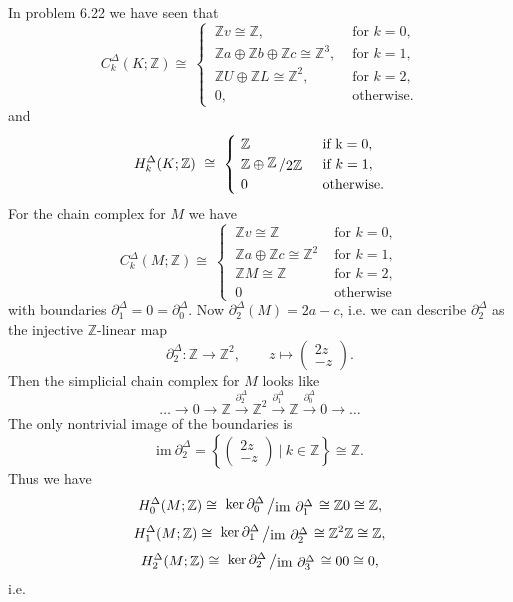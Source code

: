 \documentclass[11pt]{book}
\numberwithin{dummy}{section}
\theoremstyle{nonumberbreak}
\newenvironment{sol}[1][]{\ifthenelse{\equal{#1}{}}{\solution}{\solution[#1]}\rm}{\endsolution}
\newenvironment{prob}[1][]{\ifthenelse{\equal{#1}{}}{\problem}{\problem[#1]}\rm}{\endproblem}
\newcommand{\la}{\longrightarrow}
\newcommand{\Z}{\mathbb{Z}}
\newcommand{\slant}[2]{{\raisebox{.1em}{$#1$}\left/\raisebox{-.1em}{$#2$}\right.}}
\begin{document}
\begin{spacing}{1.4}
\begin{prob}
\begin{sol}
\begin{compactenum}
\item In problem 6.22 we have seen that
$$C_k^{\Delta}(K;\Z) \cong \ \begin{cases} \ \Z v \cong \Z, & \textrm{ for }k=0, \\ \ \Z a \oplus \Z b \oplus \Z c \cong \Z^3, & \textrm{ for } k=1, \\ \ \Z U \oplus \Z L \cong \Z^2, &\textrm{ for }k=2, \\ \ 0,& \textrm{ otherwise.} \end{cases}$$
and 
$$H_k^{\Delta}(K;\Z) \ \cong \ \begin{cases} \ \Z & \textrm{ if k}=0, \\ \ \Z \oplus \slant{\Z}{2 \Z} & \textrm{ if }k=1, \\ \ 0 & \textrm{ otherwise.} \end{cases}$$
For the chain complex for $M$ we have 
$$C_k^{\Delta}(M;\Z) \cong \ \begin{cases} \ \Z v \cong \Z & \textrm{ for }k=0,\\ \ \Z a \oplus \Z c \cong \Z^2 & \textrm{ for }k=1, \\ \ \Z M \cong \Z & \textrm{ for } k=2,\\ \ 0 & \textrm{ otherwise} \end{cases}$$
with boundaries $\partial_1^{\Delta}=0= \partial_0^{\Delta}$. Now $\partial_2^{\Delta}(M) = 2a-c$, i.e. we can describe $\partial_2^{\Delta}$ as the injective $\Z$-linear map 
$$\partial_2^{\Delta}: \Z \la \Z^2, \qquad z \mapsto \begin{pmatrix}2z\\[-6pt] -z \end{pmatrix}.$$
Then the simplicial chain complex for $M$ looks like 
$$ \ldots \la 0 \la \Z \overset{\partial^{\Delta}_2}{\la} \Z^2 \overset{\partial^{\Delta}_1}{\la} \Z \overset{\partial^{\Delta}_0}{\la} 0 \la \ldots$$
The only nontrivial image of the boundaries is
$$\mathrm{im} \ \partial_2^{\Delta} = \left\{ \begin{pmatrix} 2z \\[-6pt] -z \end{pmatrix} \ \Bigg\vert \ k \in \Z \right\} \cong \Z.$$
Thus we have 
$$H_0^{\Delta}(M;\Z) \cong \ \slant{\ker \partial_0^{\Delta}}{\mathrm{im}\ \partial_1^{\Delta}} \cong {\Z}{0} \cong \Z,$$
$$H_1^{\Delta}(M;\Z) \cong \ \slant{\ker \partial_1^{\Delta}}{\mathrm{im}\ \partial_2^{\Delta}} \cong {\Z^2}{\Z} \cong \Z,$$
$$H_2^{\Delta}(M;\Z) \cong \ \slant{\ker \partial_2^{\Delta}}{\mathrm{im}\ \partial_3^{\Delta}} \cong {0}{0} \cong 0,$$
i.e. 

\end{compactenum}
\end{sol}
\end{prob}
\end{spacing}
\end{document}
